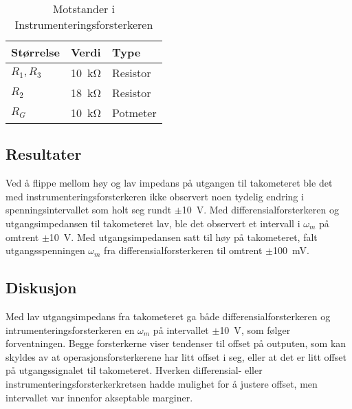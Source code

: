 \begin{table}[h]
	\centering
    \caption{Motstander i Instrumenteringsforsterkeren}
	\begin{tabular}{lll}
		\toprule
		Størrelse & Verdi & Type \\
		\midrule
        $R_1, R_3$ & \SI{10}{\kilo\ohm} & Resistor \\
        $R_2$ & \SI{18}{\kilo\ohm} & Resistor\\
        $R_G$ & \SI{10}{\kilo\ohm} & Potmeter\\
		\bottomrule
	\end{tabular}
    \label{tab:Instrumenteringsforsterker}
\end{table}







\subsection{Resultater}

Ved å flippe mellom høy og lav impedans på utgangen til takometeret ble det med instrumenteringsforsterkeren ikke observert noen tydelig endring i spenningsintervallet som holt seg rundt $\pm${\SI{10}{\volt}}. Med differensialforsterkeren og utgangsimpedansen til takometeret lav, ble det observert et intervall i $\omega_m$ på omtrent $\pm${\SI{10}{\volt}}. Med utgangsimpedansen satt til høy på takometeret, falt utgangsspenningen $\omega_m$ fra differensialforsterkeren til omtrent $\pm${\SI{100}{\milli\volt}}.






\subsection{Diskusjon}

Med lav utgangsimpedans fra takometeret ga både differensialforsterkeren og intrumenteringsforsterkeren en $\omega_m$ på intervallet $\pm${\SI{10}{\volt}}, som følger forventningen. Begge forsterkerne viser tendenser til offset på outputen, som kan skyldes av at operasjonsforsterkerene har litt offset i seg, eller at det er litt offset på utgangssignalet til takometeret. 
Hverken differensial- eller instrumenteringsforsterkerkretsen hadde mulighet for å justere offset, men intervallet var innenfor akseptable marginer.


